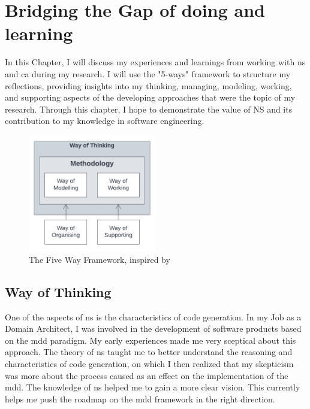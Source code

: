 \section{Bridging the Gap of doing and learning} \label{chap_reflection}

In this Chapter, I will discuss my experiences and learnings from working with \gls{ns}
and \gls{ca} during my research. I will use the "5-ways" framework to structure my
reflections, providing insights into my thinking, managing, modeling, working, and
supporting aspects of the developing approaches that were the topic of my research.
Through this chapter, I hope to demonstrate the value of NS and its contribution to my
knowledge in software engineering.

\begin{figure}[H]
    \centering
    \includegraphics[width=0.5\textwidth]{figures/5ways.pdf}
    \caption[The Five Way Framework]{The Five Way Framework, inspired by \textcite{dietz_enterprise_2020}}
    \label{fig_5ways}
\end{figure}

\subsection{Way of Thinking}

One of the aspects of \gls{ns} is the characteristics of code generation. In my Job as a
Domain Architect, I was involved in the development of software products based on the
\gls{mdd} paradigm. My early experiences made me very sceptical about this approach. The
theory of \gls{ns} taught me to better understand the reasoning and characteristics of
code generation, on which I then realized that my skepticism was more about the process
caused as an effect on the implementation of the \gls{mdd}. The knowledge of \gls{ns}
helped me to gain a more clear vision. This currently helps me push the roadmap on the
\gls{mdd} framework in the right direction.

